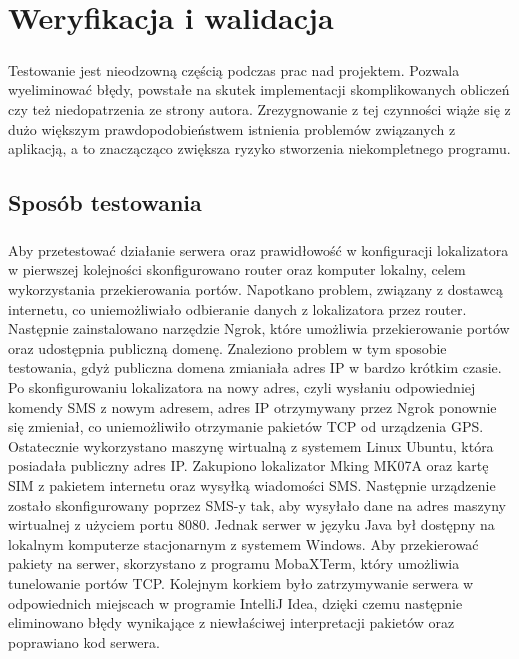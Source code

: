 \chapter{Weryfikacja i walidacja}
\label{ch:06}

\paragraph{}
Testowanie jest nieodzowną częścią podczas prac nad projektem. Pozwala wyeliminować błędy, powstałe na skutek implementacji skomplikowanych obliczeń czy też niedopatrzenia ze strony autora. Zrezygnowanie z tej czynności wiąże się z dużo większym prawdopodobieństwem istnienia problemów związanych z aplikacją, a to znaczącząco zwiększa ryzyko stworzenia niekompletnego programu.

\section{Sposób testowania}
\paragraph{}
Aby przetestować działanie serwera oraz prawidłowość w konfiguracji lokalizatora w pierwszej kolejności skonfigurowano router oraz komputer lokalny, celem wykorzystania przekierowania portów. Napotkano problem, związany z dostawcą internetu, co uniemożliwiało odbieranie danych z lokalizatora przez router. Następnie zainstalowano narzędzie Ngrok, które umożliwia przekierowanie portów oraz udostępnia publiczną domenę. Znaleziono problem w tym sposobie testowania, gdyż publiczna domena zmianiała adres IP w bardzo krótkim czasie. Po skonfigurowaniu lokalizatora na nowy adres, czyli wysłaniu odpowiedniej komendy SMS z nowym adresem, adres IP otrzymywany przez Ngrok ponownie się zmieniał, co uniemożliwiło otrzymanie pakietów TCP od urządzenia GPS. Ostatecznie wykorzystano maszynę wirtualną z systemem Linux Ubuntu, która posiadała publiczny adres IP. Zakupiono lokalizator Mking MK07A oraz kartę SIM z pakietem internetu oraz wysyłką wiadomości SMS. Następnie urządzenie zostało skonfigurowany poprzez SMS-y tak, aby wysyłało dane na adres maszyny wirtualnej z użyciem portu 8080. Jednak serwer w języku Java był dostępny na lokalnym komputerze stacjonarnym z systemem Windows. Aby przekierować pakiety na serwer, skorzystano z programu MobaXTerm, który umożliwia tunelowanie portów TCP. Kolejnym korkiem było zatrzymywanie serwera w odpowiednich miejscach w programie IntelliJ Idea, dzięki czemu następnie eliminowano błędy wynikające z niewłaściwej interpretacji pakietów oraz poprawiano kod serwera.

